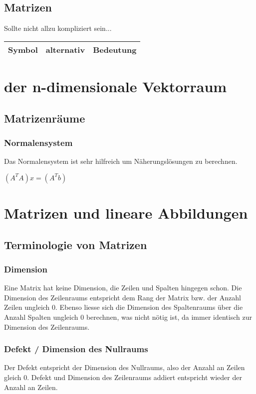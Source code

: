 \documentclass[11pt,a4paper,onecolumn]{scrartcl}
\begin{document}
\begin{flushleft}
\subsection{Matrizen}
Sollte nicht allzu kompliziert sein... \linebreak
\begin{tabular}{|c|c|c|}
\hline
Symbol & alternativ & Bedeutung \\
\hline


\end{tabular}
\section{der n-dimensionale Vektorraum}
\subsection{Matrizenräume}
\subsubsection{Normalensystem}
Das Normalensystem ist sehr hilfreich um Näherungslösungen zu berechnen.\linebreak
\linebreak

$(A^{T}A)x=(A^{T}b)$

\section{Matrizen und lineare Abbildungen}
\subsection{Terminologie von Matrizen}
\subsubsection{Dimension}
Eine Matrix hat keine Dimension, die Zeilen und Spalten hingegen schon. \linebreak
Die Dimension des Zeilenraums entspricht dem Rang der Matrix bzw. der Anzahl Zeilen ungleich 0. \linebreak
Ebenso liesse sich die Dimension des Spaltenraums über die Anzahl Spalten ungleich 0 berechnen, was nicht nötig ist, da immer identisch zur Dimension des Zeilenraums.
\subsubsection{Defekt / Dimension des Nullraums}
Der Defekt entspricht der Dimension des Nullraums, also der Anzahl an Zeilen gleich 0. \linebreak
Defekt und Dimension des Zeilenraums addiert entspricht wieder der Anzahl an Zeilen.

\end{flushleft}
\end{document}
